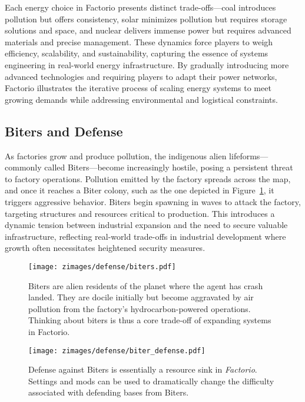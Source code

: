 Each energy choice in Factorio presents distinct trade-offs—coal introduces pollution but offers consistency, solar minimizes pollution but requires storage solutions and space, and nuclear delivers immense power but requires advanced materials and precise management. These dynamics force players to weigh efficiency, scalability, and sustainability, capturing the essence of systems engineering in real-world energy infrastructure. By gradually introducing more advanced technologies and requiring players to adapt their power networks, Factorio illustrates the iterative process of scaling energy systems to meet growing demands while addressing environmental and logistical constraints.

\subsection{Biters and Defense}
As factories grow and produce pollution, the indigenous alien lifeforms—commonly called Biters—become increasingly hostile, posing a persistent threat to factory operations. Pollution emitted by the factory spreads across the map, and once it reaches a Biter colony, such as the one depicted in Figure~\ref{fig:biter_colony}, it triggers aggressive behavior. Biters begin spawning in waves to attack the factory, targeting structures and resources critical to production. This introduces a dynamic tension between industrial expansion and the need to secure valuable infrastructure, reflecting real-world trade-offs in industrial development where growth often necessitates heightened security measures.

\begin{figure}[ht]
    \centering
    \texttt{[image: zimages/defense/biters.pdf]}
    \caption{Biters are alien residents of the planet where the agent has crash landed. They are docile initially but become aggravated by air pollution from the factory's hydrocarbon-powered operations. Thinking about biters is thus a core trade-off of expanding systems in Factorio.}
    \label{fig:biter_colony}
\end{figure}

\begin{figure}[ht]
    \centering
    \texttt{[image: zimages/defense/biter\_defense.pdf]}
    \caption{Defense against Biters is essentially a resource sink in \textit{Factorio}. Settings and mods can be used to dramatically change the difficulty associated with defending bases from Biters.}
    \label{fig:biter_defense}
\end{figure}

